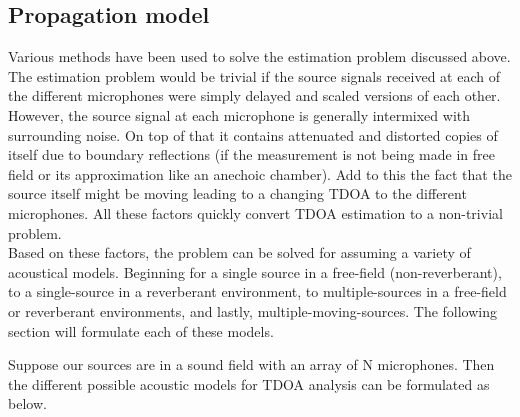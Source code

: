 \subsection{Propagation model}
Various methods have been used \cite{benesty2008microphone} to solve the estimation problem discussed above. The estimation problem would be trivial if the source signals received at each of the different microphones were simply delayed and scaled versions of each other. However, the source signal at each microphone is generally intermixed with surrounding noise. On top of that it contains attenuated and distorted copies of itself due to boundary reflections (if the measurement is not being made in free field or its approximation like an anechoic chamber). Add to this the fact that the source itself might be moving leading to a changing TDOA to the different microphones. All these factors quickly convert TDOA estimation to a non-trivial problem. \\
Based on these factors, the problem can be solved for assuming a variety of acoustical models. Beginning for a single source in a free-field (non-reverberant), to a single-source in a reverberant environment, to multiple-sources in a free-field or reverberant environments, and lastly, multiple-moving-sources. The following section will formulate each of these models.

Suppose our sources are in a sound field with an array of N microphones. Then the different possible acoustic models for TDOA analysis can be formulated as below.

